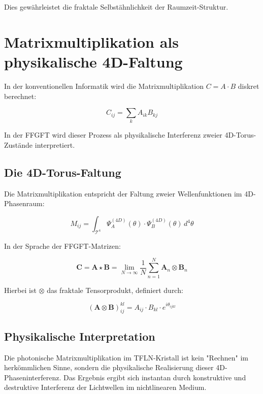 	Dies gewährleistet die fraktale Selbstähnlichkeit der Raumzeit-Struktur.
	
	\section{Matrixmultiplikation als physikalische 4D-Faltung}
	
	In der konventionellen Informatik wird die Matrixmultiplikation $C = A \cdot B$ diskret berechnet:
	
	\begin{equation}
		C_{ij} = \sum_{k} A_{ik} B_{kj}
	\end{equation}
	
	In der FFGFT wird dieser Prozess als physikalische Interferenz zweier 4D-Torus-Zustände interpretiert.
	
	\subsection{Die 4D-Torus-Faltung}
	
	Die Matrixmultiplikation entspricht der Faltung zweier Wellenfunktionen im 4D-Phasenraum:
	
	\begin{equation}
		M_{ij} = \int_{\mathcal{T}^4} \Psi_A^{(4D)}(\theta) \cdot \Psi_B^{(4D)}(\theta) \, d^4\theta
	\end{equation}
	
	In der Sprache der FFGFT-Matrizen:
	
	\begin{equation}
		\mathbf{C} = \mathbf{A} \star \mathbf{B} = \lim_{N \to \infty} \frac{1}{N} \sum_{n=1}^{N} \mathbf{A}_n \otimes \mathbf{B}_n
	\end{equation}
	
	Hierbei ist $\otimes$ das fraktale Tensorprodukt, definiert durch:
	
	\begin{equation}
		(\mathbf{A} \otimes \mathbf{B})_{ij}^{kl} = A_{ij} \cdot B_{kl} \cdot e^{i \theta_{ijkl}}
	\end{equation}
	
	\subsection{Physikalische Interpretation}
	
	Die photonische Matrixmultiplikation im TFLN-Kristall ist kein "Rechnen" im herkömmlichen Sinne, sondern die physikalische Realisierung dieser 4D-Phaseninterferenz. Das Ergebnis ergibt sich instantan durch konstruktive und destruktive Interferenz der Lichtwellen im nichtlinearen Medium.
	
